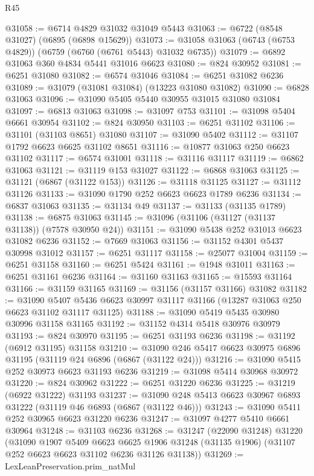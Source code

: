 \begin{lexlean}{R45}
\begin{coremodule}
{@31058 := @6714 @4829 @31032 @31049 @5443
@31063 := @6722 (@8548 @31027) (@6895 (@6898 @15629))
@31073 := @31058 @31063 (@6743 (@6753 @4829)) (@6759 (@6760 (@6761 @5443) @31032 @6735))
@31079 := @6892 @31063 @360 @4834 @5441 @31016 @6623
@31080 := @824 @30952
@31081 := @6251 @31080
@31082 := @6574 @31046
@31084 := @6251 @31082 @6236
@31089 := @31079 (@31081 @31084) (@13223 @31080 @31082)
@31090 := @6828 @31063
@31096 := @31090 @5405 @5440 @30955 @31015 @31080 @31084
@31097 := @6813 @31063
@31098 := @31097 @753
@31101 := @31098 @5404 @6661 @30954
@31102 := @824 @30950
@31103 := @6251 @31102
@31106 := @31101 (@31103 @8651) @31080
@31107 := @31090 @5402
@31112 := @31107 @1792 @6623 @6625 @31102 @8651
@31116 := @10877 @31063 @250 @6623 @31102
@31117 := @6574 @31001
@31118 := @31116 @31117
@31119 := @6862 @31063
@31121 := @31119 @153 @31027
@31122 := @6868 @31063
@31125 := @31121 (@6867 (@31122 @153))
@31126 := @31118 @31125
@31127 := @31112 @31126
@31133 := @31090 @1790 @252 @6623 @6623 @1789 @6236
@31134 := @6837 @31063
@31135 := @31134 @49
@31137 := @31133 (@31135 @1789)
@31138 := @6875 @31063
@31145 := @31096 (@31106 (@31127 (@31137 @31138)) (@7578 @30950 @24))
@31151 := @31090 @5438 @252 @31013 @6623 @31082 @6236
@31152 := @7669 @31063
@31156 := @31152 @4301 @5437 @30998 @31012
@31157 := @6251 @31117
@31158 := @25077 @31004
@31159 := @6251 @31158
@31160 := @6251 @5424
@31161 := @1948 @31011
@31163 := @6251 @31161 @6236
@31164 := @31160 @31163
@31165 := @15593 @31164
@31166 := @31159 @31165
@31169 := @31156 (@31157 @31166) @31082
@31182 := @31090
    @5407
    @5436
    @6623
    @30997
    @31117
    @31166
    (@13287 @31063 @250 @6623 @31102 @31117 @31125)
@31188 := @31090 @5419 @5435 @30980 @30996 @31158 @31165
@31192 := @31152 @4314 @5418 @30976 @30979
@31193 := @824 @30970
@31195 := @6251 @31193 @6236
@31198 := @31192 (@6912 @31195) @31158
@31210 := @31090 @246 @5417 @6623 @30975 @6896 @31195 (@31119 @24 @6896 (@6867 (@31122 @24)))
@31216 := @31090 @5415 @252 @30973 @6623 @31193 @6236
@31219 := @31098 @5414 @30968 @30972
@31220 := @824 @30962
@31222 := @6251 @31220 @6236
@31225 := @31219 (@6922 @31222) @31193
@31237 := @31090 @248 @5413 @6623 @30967 @6893 @31222 (@31119 @46 @6893 (@6867 (@31122 @46)))
@31243 := @31090 @5411 @252 @30965 @6623 @31220 @6236
@31247 := @31097 @4277 @5410 @6661 @30964
@31248 := @31103 @6236
@31268 := @31247
    (@22090 @31248)
    @31220
    (@31090
      @1907
      @5409
      @6623
      @6625
      @1906
      @31248
      (@31135 @1906)
      (@31107 @252 @6623 @6623 @31102 @6236 @31126 @31138))
@31269 := LexLeanPreservation.prim_natMul
}
\end{coremodule}
\end{lexlean}
